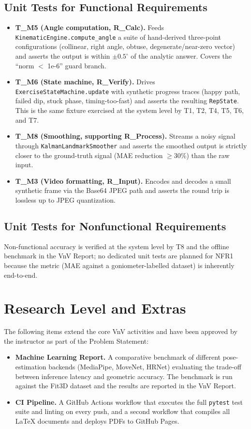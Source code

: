\documentclass[12pt, titlepage]{article}
\begin{document}
\subsection{Unit Tests for Functional Requirements}
\begin{itemize}
  \item \textbf{T\_M5 (Angle computation, R\_Calc).} Feeds
    \texttt{KinematicEngine.compute\_angle} a suite of hand-derived
    three-point configurations (collinear, right angle, obtuse,
    degenerate/near-zero vector) and asserts the output is within
    $\pm 0.5^\circ$ of the analytic answer. Covers the ``norm $<$ 1e-6''
    guard branch.
  \item \textbf{T\_M6 (State machine, R\_Verify).} Drives
    \texttt{ExerciseStateMachine.update} with synthetic progress
    traces (happy path, failed dip, stuck phase, timing-too-fast) and
    asserts the resulting \texttt{RepState}. This is the same fixture
    exercised at the system level by T1, T2, T4, T5, T6, and T7.
  \item \textbf{T\_M8 (Smoothing, supporting R\_Process).} Streams a
    noisy signal through \texttt{KalmanLandmarkSmoother} and asserts
    the smoothed output is strictly closer to the ground-truth signal
    (MAE reduction $\ge 30\%$) than the raw input.
  \item \textbf{T\_M3 (Video formatting, R\_Input).} Encodes and
    decodes a small synthetic frame via the Base64 JPEG path and
    asserts the round trip is lossless up to JPEG quantization.
\end{itemize}

\subsection{Unit Tests for Nonfunctional Requirements}
Non-functional accuracy is verified at the system level by T8 and the
offline benchmark in the VnV Report; no dedicated unit tests are
planned for NFR1 because the metric (MAE against a goniometer-labelled
dataset) is inherently end-to-end.

\section{Research Level and Extras}

The following items extend the core VnV activities and have been
approved by the instructor as part of the Problem Statement:
\begin{itemize}
  \item \textbf{Machine Learning Report.} A comparative benchmark of
    different pose-estimation backends (MediaPipe, MoveNet, HRNet)
    evaluating the trade-off between inference latency and geometric
    accuracy. The benchmark is run against the Fit3D dataset and the
    results are reported in the VnV Report.
  \item \textbf{CI Pipeline.} A GitHub Actions workflow that executes
    the full \texttt{pytest} test suite and linting on every push, and
    a second workflow that compiles all LaTeX documents and deploys
    PDFs to GitHub Pages.
\end{itemize}
\end{document}
